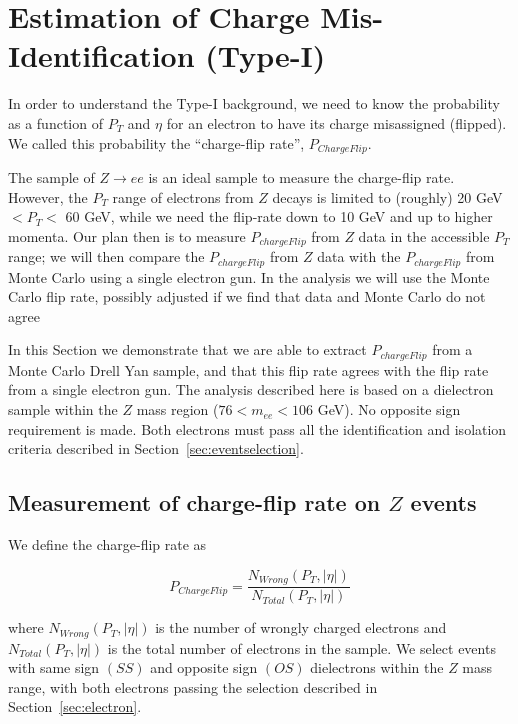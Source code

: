 \section{Estimation of Charge Mis-Identification (Type-I)}
\label{sec:chargemisid}

In order to understand the Type-I background, we need to know the 
probability as a function of $P_T$ and $\eta$ for an electron
to have its charge misassigned (flipped).  We called this 
probability the ``charge-flip rate'', $P_{ChargeFlip}$.


The sample of $Z \to ee$ is an ideal sample to measure the charge-flip rate.
However, the $P_T$ range of electrons from $Z$ decays is limited
to (roughly) 20 GeV $< P_T <$ 60 GeV, while we need the flip-rate
down to 10 GeV and up to higher momenta.
Our plan then is to measure $P_{chargeFlip}$ from $Z$ data in the 
accessible $P_T$ range;  we will then compare 
the $P_{chargeFlip}$ from $Z$ data with the $P_{chargeFlip}$ from 
Monte Carlo using a single electron gun.  In the analysis we will
use the Monte Carlo flip rate, possibly adjusted if we find that
data and Monte Carlo do not agree


In this Section we demonstrate that we are able to extract 
$P_{chargeFlip}$ from a Monte Carlo Drell Yan sample, and that
this flip rate agrees with the flip rate from a 
single electron gun.  The analysis described here is based on 
a dielectron sample within the $Z$ mass region
($76 < m_{ee} < 106 $ GeV).   No opposite sign requirement is 
made.  Both electrons must pass all the identification and isolation
criteria described in Section~\ref{sec:eventselection}.



\subsection{Measurement of charge-flip rate on $Z$ events}

We define the charge-flip rate as

\begin{equation}
P_{ChargeFlip} = \frac{N_{Wrong}(P_T, |\eta|)}{N_{Total}(P_T, |\eta|)}
\end{equation}

where $N_{Wrong}(P_T, |\eta|)$ is the number of wrongly charged electrons  
and $N_{Total}(P_T, |\eta|)$ is 
the total number of electrons in the sample. We select events with same sign $(SS)$ 
and opposite sign $(OS)$ dielectrons within the $Z$ mass range, with both electrons passing the 
selection described in Section~\ref{sec:electron}.

